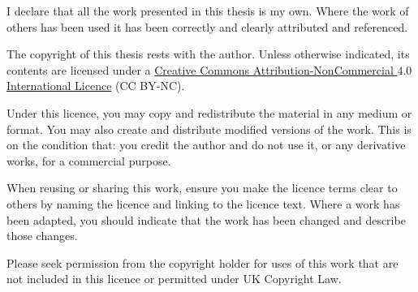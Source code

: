 I declare that all the work presented in this thesis is my own. Where the work
of others has been used it has been correctly and clearly attributed and
referenced.

The copyright of this thesis rests with the author. Unless otherwise indicated,
its contents are licensed under a
\href{https://creativecommons.org/licenses/by/4.0/}{Creative Commons
Attribution-NonCommercial $4.0$ International Licence} (CC BY-NC).

Under this licence, you may copy and redistribute the material in any medium or
format. You may also create and distribute modified versions of the work. This
is on the condition that: you credit the author and do not use it, or any
derivative works, for a commercial purpose.

When reusing or sharing this work, ensure you make the licence terms clear to
others by naming the licence and linking to the licence text. Where a work has
been adapted, you should indicate that the work has been changed and describe
those changes.

Please seek permission from the copyright holder for uses of this work that are
not included in this licence or permitted under UK Copyright Law.
